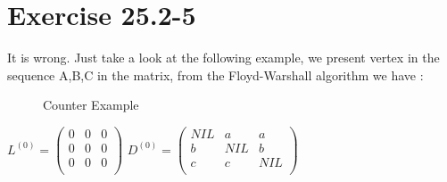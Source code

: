 \documentclass[oneside]{homework} %
\begin{document}
\maketitle
\newpage
\section{Exercise 25.2-5}
It is wrong. Just take a look at the following example, we present vertex in the sequence A,B,C in the matrix, from the Floyd-Warshall algorithm we have : \\
\begin{figure}[h]
  \centering
  \caption{Counter Example}
  \label{fig:ce1}
\end{figure}


\begin{multicols}{2}
$
L^{(0)} =
 \begin{pmatrix}
   0 & 0 & 0\\
   0 & 0 & 0\\
   0 & 0 & 0\\
 \end{pmatrix}
$
\columnbreak
$
D^{(0)} =
 \begin{pmatrix}
   NIL & a & a \\
   b   & NIL & b \\
   c & c & NIL \\
 \end{pmatrix}
$
\end{multicols}
\end{document}
